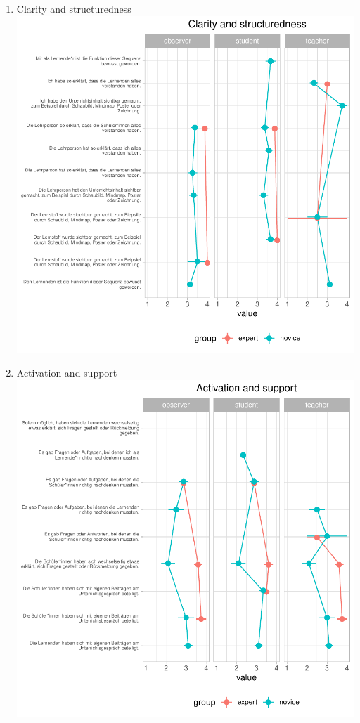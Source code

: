 \documentclass[
  english,
  man,floatsintext]{apa6}
\begin{document}
\begin{enumerate}
\item
  Clarity and structuredness
  \includegraphics{paper_1_supplement_files/figure-latex/Clarity and structuredness line plots-1.pdf}
\item
  Activation and support
  \includegraphics{paper_1_supplement_files/figure-latex/Activation and support line plots-1.pdf}

\end{enumerate}
\end{document}
